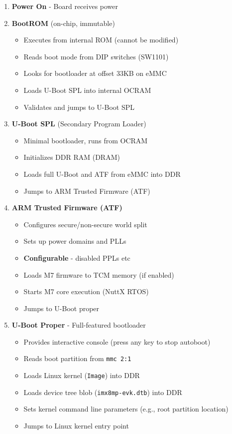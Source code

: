 \documentclass[12pt,a4paper]{report}
\begin{document}
\begin{enumerate}
    \item \textbf{Power On} - Board receives power
    
    \item \textbf{BootROM} (on-chip, immutable)
    \begin{itemize}
        \item Executes from internal ROM (cannot be modified)
        \item Reads boot mode from DIP switches (SW1101)
        \item Looks for bootloader at offset 33KB on eMMC
        \item Loads U-Boot SPL into internal OCRAM
        \item Validates and jumps to U-Boot SPL
    \end{itemize}
    
    \item \textbf{U-Boot SPL} (Secondary Program Loader)
    \begin{itemize}
        \item Minimal bootloader, runs from OCRAM
        \item Initializes DDR RAM (DRAM)
        \item Loads full U-Boot and ATF from eMMC into DDR
        \item Jumps to ARM Trusted Firmware (ATF)
    \end{itemize}
    
    \item \textbf{ARM Trusted Firmware (ATF)}
    \begin{itemize}
        \item Configures secure/non-secure world split
        \item Sets up power domains and PLLs
        \item \textbf{Configurable} - disabled PPLs etc
        \item Loads M7 firmware to TCM memory (if enabled)
        \item Starts M7 core execution (NuttX RTOS)
        \item Jumps to U-Boot proper
    \end{itemize}
    
    \item \textbf{U-Boot Proper} - Full-featured bootloader
    \begin{itemize}
        \item Provides interactive console (press any key to stop autoboot)
        \item Reads boot partition from \texttt{mmc 2:1}
        \item Loads Linux kernel (\texttt{Image}) into DDR
        \item Loads device tree blob (\texttt{imx8mp-evk.dtb}) into DDR
        \item Sets kernel command line parameters (e.g., root partition location)
        \item Jumps to Linux kernel entry point
    \end{itemize}
    

\end{enumerate}
\end{document}

